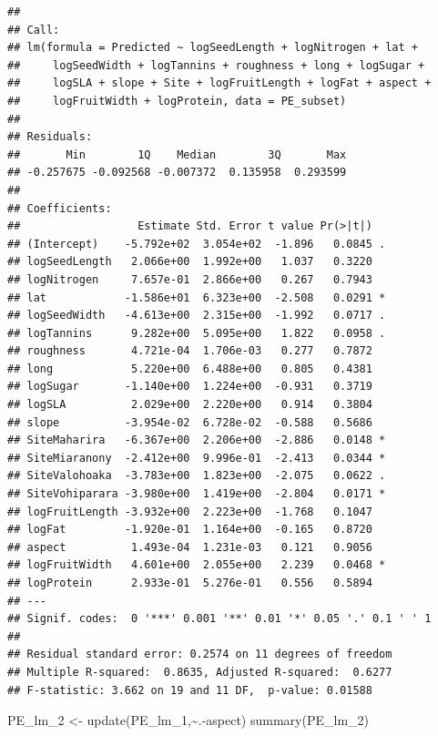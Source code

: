 \documentclass[
  12pt,
]{article}
\newenvironment{Shaded}{\begin{snugshade}}{\end{snugshade}}
\newcommand{\FunctionTok}[1]{\textcolor[rgb]{0.00,0.00,0.00}{#1}}
\newcommand{\NormalTok}[1]{#1}
\newcommand{\OtherTok}[1]{\textcolor[rgb]{0.56,0.35,0.01}{#1}}
\newcommand{\SpecialCharTok}[1]{\textcolor[rgb]{0.00,0.00,0.00}{#1}}
\begin{document}
\begin{verbatim}
## 
## Call:
## lm(formula = Predicted ~ logSeedLength + logNitrogen + lat + 
##     logSeedWidth + logTannins + roughness + long + logSugar + 
##     logSLA + slope + Site + logFruitLength + logFat + aspect + 
##     logFruitWidth + logProtein, data = PE_subset)
## 
## Residuals:
##       Min        1Q    Median        3Q       Max 
## -0.257675 -0.092568 -0.007372  0.135958  0.293599 
## 
## Coefficients:
##                  Estimate Std. Error t value Pr(>|t|)  
## (Intercept)    -5.792e+02  3.054e+02  -1.896   0.0845 .
## logSeedLength   2.066e+00  1.992e+00   1.037   0.3220  
## logNitrogen     7.657e-01  2.866e+00   0.267   0.7943  
## lat            -1.586e+01  6.323e+00  -2.508   0.0291 *
## logSeedWidth   -4.613e+00  2.315e+00  -1.992   0.0717 .
## logTannins      9.282e+00  5.095e+00   1.822   0.0958 .
## roughness       4.721e-04  1.706e-03   0.277   0.7872  
## long            5.220e+00  6.488e+00   0.805   0.4381  
## logSugar       -1.140e+00  1.224e+00  -0.931   0.3719  
## logSLA          2.029e+00  2.220e+00   0.914   0.3804  
## slope          -3.954e-02  6.728e-02  -0.588   0.5686  
## SiteMaharira   -6.367e+00  2.206e+00  -2.886   0.0148 *
## SiteMiaranony  -2.412e+00  9.996e-01  -2.413   0.0344 *
## SiteValohoaka  -3.783e+00  1.823e+00  -2.075   0.0622 .
## SiteVohiparara -3.980e+00  1.419e+00  -2.804   0.0171 *
## logFruitLength -3.932e+00  2.223e+00  -1.768   0.1047  
## logFat         -1.920e-01  1.164e+00  -0.165   0.8720  
## aspect          1.493e-04  1.231e-03   0.121   0.9056  
## logFruitWidth   4.601e+00  2.055e+00   2.239   0.0468 *
## logProtein      2.933e-01  5.276e-01   0.556   0.5894  
## ---
## Signif. codes:  0 '***' 0.001 '**' 0.01 '*' 0.05 '.' 0.1 ' ' 1
## 
## Residual standard error: 0.2574 on 11 degrees of freedom
## Multiple R-squared:  0.8635, Adjusted R-squared:  0.6277 
## F-statistic: 3.662 on 19 and 11 DF,  p-value: 0.01588
\end{verbatim}

\begin{Shaded}
\begin{Highlighting}[]
\NormalTok{PE\_lm\_2 }\OtherTok{\textless{}{-}} \FunctionTok{update}\NormalTok{(PE\_lm\_1,}\SpecialCharTok{\textasciitilde{}}\NormalTok{.}\SpecialCharTok{{-}}\NormalTok{aspect)}
\FunctionTok{summary}\NormalTok{(PE\_lm\_2)}
\end{Highlighting}
\end{Shaded}
\end{document}

